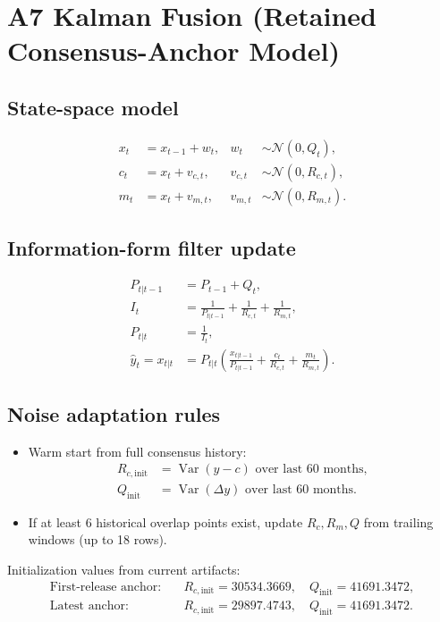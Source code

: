 \documentclass[11pt]{article}
\begin{document}
\section{A7 Kalman Fusion (Retained Consensus-Anchor Model)}
\subsection{State-space model}
\begin{align}
x_t &= x_{t-1}+w_t, & w_t &\sim\mathcal{N}(0,Q_t),\\
c_t &= x_t+v_{c,t}, & v_{c,t} &\sim\mathcal{N}(0,R_{c,t}),\\
m_t &= x_t+v_{m,t}, & v_{m,t} &\sim\mathcal{N}(0,R_{m,t}).
\end{align}

\subsection{Information-form filter update}
\begin{align}
P_{t|t-1} &= P_{t-1}+Q_t,\\
I_t &= \frac{1}{P_{t|t-1}}+\frac{1}{R_{c,t}}+\frac{1}{R_{m,t}},\\
P_{t|t} &= \frac{1}{I_t},\\
\hat{y}_t = x_{t|t} &= P_{t|t}\left(\frac{x_{t|t-1}}{P_{t|t-1}}+\frac{c_t}{R_{c,t}}+\frac{m_t}{R_{m,t}}\right).
\end{align}

\subsection{Noise adaptation rules}
\begin{itemize}
    \item Warm start from full consensus history:
    \begin{align*}
    R_{c,\text{init}} &= \operatorname{Var}(y-c)\text{ over last 60 months},\\
    Q_{\text{init}} &= \operatorname{Var}(\Delta y)\text{ over last 60 months}.
    \end{align*}
    \item If at least 6 historical overlap points exist, update $R_c,R_m,Q$ from trailing windows (up to 18 rows).
\end{itemize}

Initialization values from current artifacts:
\begin{align*}
\text{First-release anchor:}\quad &R_{c,\text{init}}=30534.3669,\quad Q_{\text{init}}=41691.3472,\\
\text{Latest anchor:}\quad &R_{c,\text{init}}=29897.4743,\quad Q_{\text{init}}=41691.3472.
\end{align*}
\end{document}
